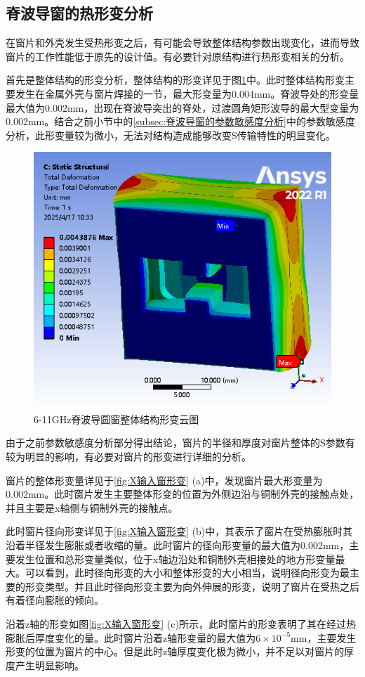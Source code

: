 \documentclass[master]{thesis-uestc}
\begin{document}
\subsection{脊波导窗的热形变分析}
在窗片和外壳发生受热形变之后，有可能会导致整体结构参数出现变化，进而导致窗片的工作性能低于原先的设计值。有必要针对原结构进行热形变相关的分析。

首先是整体结构的形变分析，整体结构的形变详见于图\ref{fig:X整体结构形变}中。此时整体结构形变主要发生在金属外壳与窗片焊接的一节，最大形变量为0.004mm。脊波导处的形变量最大值为0.002mm，出现在脊波导突出的脊处，过渡圆角矩形波导的最大型变量为0.002mm。结合之前小节中的\ref{subsec:脊波导窗的参数敏感度分析}中的参数敏感度分析，此形变量较为微小，无法对结构造成能够改变S传输特性的明显变化。
\begin{figure}[!htb]
    \centering
    \includegraphics[width=0.35\linewidth]{pic/chapter3/X输入窗与波导.png}
    \caption{6-11GHz脊波导圆窗整体结构形变云图}
    \label{fig:X整体结构形变}
\end{figure}

由于之前参数敏感度分析部分得出结论，窗片的半径和厚度对窗片整体的S参数有较为明显的影响，有必要对窗片的形变进行详细的分析。

窗片的整体形变量详见于\ref{fig:X输入窗形变} (a)中，发现窗片最大形变量为0.002mm。此时窗片发生主要整体形变的位置为外侧边沿与铜制外壳的接触点处，并且主要是x轴侧与铜制外壳的接触点。

此时窗片径向形变详见于\ref{fig:X输入窗形变} (b)中，其表示了窗片在受热膨胀时其沿着半径发生膨胀或者收缩的量。此时窗片的径向形变量的最大值为0.002mm，主要发生位置和总形变量类似，位于x轴边沿处和铜制外壳相接处的地方形变量最大。可以看到，此时径向形变的大小和整体形变的大小相当，说明径向形变为最主要的形变类型。并且此时径向形变主要为向外伸展的形变，说明了窗片在受热之后有着径向膨胀的倾向。

沿着z轴的形变如图\ref{fig:X输入窗形变} (c)所示，此时窗片的形变表明了其在经过热膨胀后厚度变化的量。此时窗片沿着z轴形变量的最大值为\(6 \times 10^{-5}\)mm，主要发生形变的位置为窗片的中心。但是此时z轴厚度变化极为微小，并不足以对窗片的厚度产生明显影响。
\end{document}
